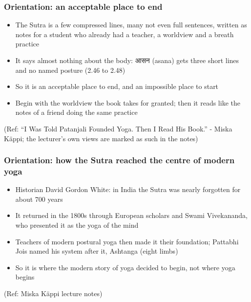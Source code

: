 \begin{frame}[fragile]\frametitle{Orientation: an acceptable place to end}

	\begin{itemize}
	\item The Sutra is a few compressed lines, many not even full sentences, written as notes for a student who already had a teacher, a worldview and a breath practice
	\item It says almost nothing about the body: आसन (asana) gets three short lines and no named posture (2.46 to 2.48)
	\item So it is an acceptable place to end, and an impossible place to start
	\item Begin with the worldview the book takes for granted; then it reads like the notes of a friend doing the same practice
	\end{itemize}

\tiny{(Ref: ``I Was Told Patanjali Founded Yoga. Then I Read His Book.'' - Miska Käppi; the lecturer's own views are marked as such in the notes)}

\end{frame}

\begin{frame}[fragile]\frametitle{Orientation: how the Sutra reached the centre of modern yoga}

	\begin{itemize}
	\item Historian David Gordon White: in India the Sutra was nearly forgotten for about 700 years
	\item It returned in the 1800s through European scholars and Swami Vivekananda, who presented it as the yoga of the mind
	\item Teachers of modern postural yoga then made it their foundation; Pattabhi Jois named his system after it, Ashtanga (eight limbs)
	\item So it is where the modern story of yoga decided to begin, not where yoga begins
	\end{itemize}

\tiny{(Ref: Miska Käppi lecture notes)}

\end{frame}


